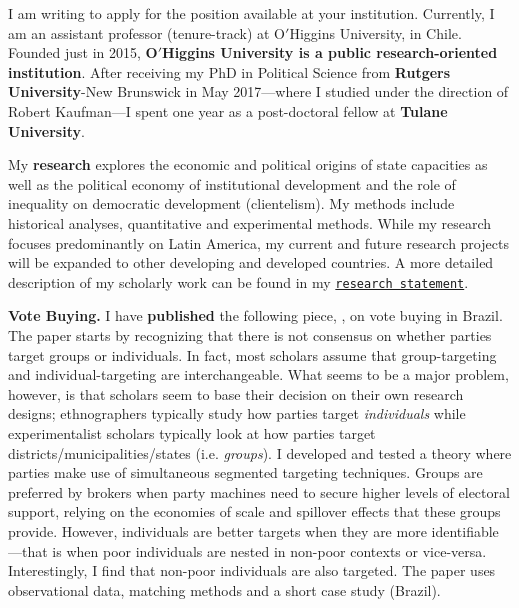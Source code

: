 \vspace{-0.3cm}I am writing to apply for the position available at your institution. Currently, I am an assistant professor (tenure-track) at O$'$Higgins University, in Chile. Founded just in 2015, {\bf O$'$Higgins University is a public research-oriented institution}.
After receiving my PhD in Political Science from {\bf Rutgers University}-New Brunswick in May 2017---where I studied under the direction of Robert Kaufman---I spent one year as a post-doctoral fellow at {\bf Tulane University}. 


My {\bf research} explores the economic and political origins of state capacities as well as the political economy of institutional development and the role of inequality on democratic development (clientelism). My methods include historical analyses, quantitative and experimental methods. While my research focuses predominantly on Latin America, my current and future research projects will be expanded to other developing and developed countries. A more detailed description of my scholarly work can be found in my \href{http://github.com/hbahamonde/Job_Market/raw/master/Bahamonde_Research_Statement.pdf}{\texttt{research statement}}.



{\bf Vote Buying.} I have {\bf published} the following piece, \emph{\unskip}, on vote buying in Brazil. The paper starts by recognizing that there is not consensus on whether parties target groups or individuals. In fact, most scholars assume that group-targeting and individual-targeting are interchangeable. What seems to be a major problem, however, is that scholars seem to base their decision on their own research designs; ethnographers typically study how parties target \emph{individuals} while experimentalist scholars typically look at how parties target districts/municipalities/states (i.e. \emph{groups}). I developed and tested a theory where parties make use of simultaneous segmented targeting techniques. Groups are preferred by brokers when party machines need to secure higher levels of electoral support, relying on the economies of scale and spillover effects that these groups provide. However, individuals are better targets when they are more identifiable---that is when poor individuals are nested in non-poor contexts or vice-versa. Interestingly, I find that non-poor individuals are also targeted. The paper uses observational data, matching methods and a short case study (Brazil).


